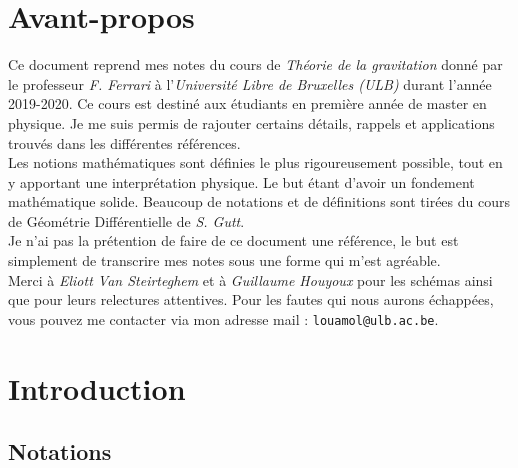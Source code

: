\documentclass[a4paper,11pt]{report}
\theoremstyle{definition}
\theoremstyle{plain}
\theoremstyle{definition}
\theoremstyle{remark}
\begin{document}
\nocite{weinberg}
\nocite{wheeler}
\nocite{hawking}
\nocite{hartle}
\nocite{price}
\nocite{nakahara}
\nocite{wald}
\nocite{lee}
\nocite{gutt}

\chapter*{Avant-propos}

    Ce document reprend mes notes du cours de \textit{Théorie de la gravitation} donné par le professeur \textit{F. Ferrari} à l'\textit{Université Libre de Bruxelles (ULB)} durant l'année 2019-2020. Ce cours est destiné aux étudiants en première année de master en physique. Je me suis permis de rajouter certains détails, rappels et applications trouvés dans les différentes références.\\
    
    Les notions mathématiques sont définies le plus rigoureusement possible, tout en y apportant une interprétation physique. Le but étant d'avoir un fondement mathématique solide. Beaucoup de notations et de définitions sont tirées du cours de Géométrie Différentielle de \textit{S. Gutt}. \\
    
    Je n'ai pas la prétention de faire de ce document une référence, le but est simplement de transcrire mes notes sous une forme qui m'est agréable.\\
    
    Merci à \textit{Eliott Van Steirteghem} et à \textit{Guillaume Houyoux} pour les schémas ainsi que pour leurs relectures attentives. Pour les fautes qui nous aurons échappées, vous pouvez me contacter via mon adresse mail : \verb?louamol@ulb.ac.be?.\\
    

\printbibliography[title=Références]
\pagebreak
\tableofcontents
\pagebreak

\chapter{Introduction}

    \section*{Notations}
    
\end{document}

